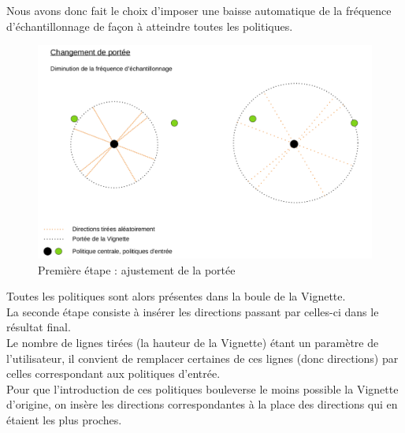 \documentclass[12pt]{article}
\begin{document}
Nous avons donc fait le choix d'imposer une baisse automatique de la fréquence d'échantillonnage de façon à atteindre toutes les politiques. \\

\begin{figure}[htp]
    \centering
    \includegraphics[width=15cm]{Images/vignette_portee}
    \caption{Première étape : ajustement de la portée}
    \label{fig:vignettePortee}
\end{figure}

Toutes les politiques sont alors présentes dans la boule de la Vignette. \\

\newpage
La seconde étape consiste à insérer les directions passant par celles-ci dans le résultat final. \\

Le nombre de lignes tirées (la hauteur de la Vignette) étant un paramètre de l'utilisateur, il convient de remplacer certaines de ces lignes (donc directions) par celles correspondant aux politiques d'entrée. \\

Pour que l'introduction de ces politiques bouleverse le moins possible la Vignette d'origine, on insère les directions correspondantes à la place des directions qui en étaient les plus proches. \\
\end{document}
